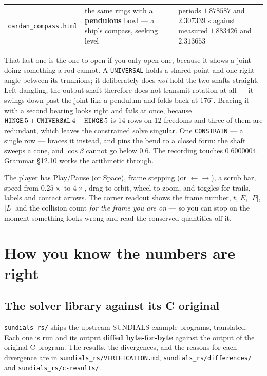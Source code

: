 \documentclass[11pt]{article}
\newcommand{\kw}[1]{\texttt{\uppercase{#1}}}
\newcommand{\code}[1]{\texttt{#1}}
\begin{document}
\begin{center}
\begin{tabular}{p{3.6cm}p{6.0cm}p{4.6cm}}
\code{cardan\_compass.html} & the same rings with a
\textbf{pendulous} bowl --- a ship's compass, seeking level &
periods $1.878587$ and $2.307339$ s against measured $1.883426$ and
$2.313653$\\
\end{tabular}
\end{center}

That last one is the one to open if you only open one, because it shows
a joint doing something a rod cannot. A \kw{universal} holds a shared
point and one right angle between its trunnions; it deliberately does
\emph{not} hold the two shafts straight. Left dangling, the output
shaft therefore does not transmit rotation at all --- it swings down
past the joint like a pendulum and folds back at $176^\circ$. Bracing
it with a second bearing looks right and fails at once, because
$\kw{hinge}\,5 + \kw{universal}\,4 + \kw{hinge}\,5$ is 14 rows on 12
freedoms and three of them are redundant, which leaves the constrained
solve singular. One \kw{constrain} --- a single row --- braces it
instead, and pins the bend to a closed form: the shaft sweeps a cone,
and $\cos\beta$ cannot go below $0.6$. The recording touches
$0.6000004$. Grammar \S12.10 works the arithmetic through.

The player has Play/Pause (or Space), frame stepping (or
$\leftarrow\rightarrow$), a scrub bar, speed from $0.25\times$ to
$4\times$, drag to orbit, wheel to zoom, and toggles for trails, labels
and contact arrows. The corner readout shows the frame number, $t$, $E$,
$|P|$, $|L|$ and the collision count \emph{for the frame you are on} ---
so you can stop on the moment something looks wrong and read the
conserved quantities off it.

\section{How you know the numbers are right}

\subsection{The solver library against its C original}

\code{sundials\_rs/} ships the upstream SUNDIALS example programs,
translated. Each one is run and its output \textbf{diffed byte-for-byte}
against the output of the original C program. The results, the
divergences, and the reasons for each divergence are in
\code{sundials\_rs/VERIFICATION.md}, \code{sundials\_rs/differences/}
and \code{sundials\_rs/c-results/}.
\end{document}
